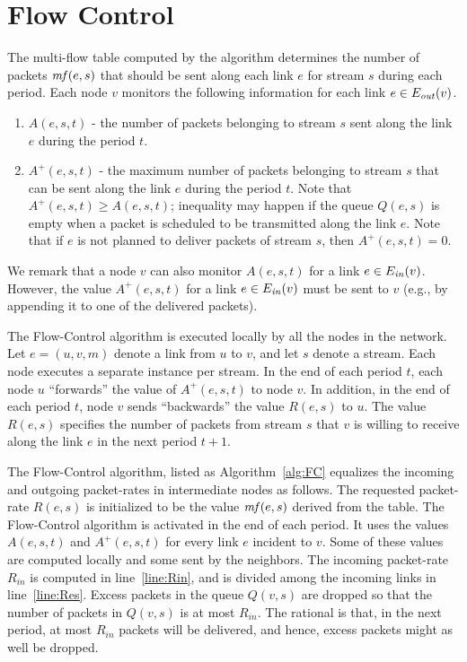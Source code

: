 \documentclass[12pt]{article}
\newenvironment{proof sketch}[1]{\noindent {\emph{Proof sketch of #1:}}}{\hfill \qed}
\newcommand{\mf}{\text{\emph{mf}}}
\newcommand{\Ein}{E_{\text{\emph{in}}}}
\newcommand{\Eout}{E_{\text{\emph{out}}}}
\begin{document}
\section{Flow Control}\label{sec:flow control}
The multi-flow table computed by the algorithm determines the number of packets $\mf(e,s)$
that should be sent along each link $e$ for stream $s$ during each period.
Each node $v$ monitors the following information for each link $e \in \Eout (v)$.
\begin{enumerate}
\item $A(e,s,t)$ - the number of packets belonging to stream $s$ sent
  along the link $e$ during the period $t$.
\item $A^+(e,s,t)$ - the maximum number of packets belonging to stream
  $s$ that can be sent along the link $e$ during the period $t$. Note
  that $A^+(e,s,t)\geq A(e,s,t)$; inequality may happen if the queue
  $Q(e,s)$ is empty when a packet is scheduled to be transmitted along
  the link $e$. Note that if $e$ is not planned to deliver packets of
  stream $s$, then $A^+(e,s,t)=0$.
\end{enumerate}
We remark that a node $v$ can also monitor $A(e,s,t)$ for a link $e\in
\Ein(v)$.  However, the value $A^+(e,s,t)$ for a link $e\in \Ein(v)$
must be sent to $v$ (e.g., by appending it to one of the delivered
packets).

The Flow-Control algorithm is executed locally by all the nodes in the
network. Let $e=(u,v,m)$ denote a link from $u$ to $v$, and let $s$
denote a stream. Each node executes a separate instance per stream.
In the end of each period $t$, each node $u$ ``forwards'' the value of
$A^+(e,s,t)$ to node $v$.  In addition, in the end of each period $t$,
node $v$ sends ``backwards'' the value $R(e,s)$ to $u$. The value
$R(e,s)$ specifies the number of packets from stream $s$ that $v$ is
willing to receive along the link $e$ in the next period
$t+1$.

The Flow-Control algorithm, listed as Algorithm~\ref{alg:FC} equalizes
the incoming and outgoing packet-rates in intermediate nodes as
follows.  The requested packet-rate $R(e,s)$ is initialized to be the
value $\mf(e,s)$ derived from the table.  The Flow-Control algorithm is
activated in the end of each period.  It uses the values $A(e,s,t)$
and $A^+(e,s,t)$ for every link $e$ incident to $v$.  Some of these
values are computed locally and some sent by the neighbors. The
incoming packet-rate $R_{in}$ is computed in line~\ref{line:Rin}, and
is divided among the incoming links in line~\ref{line:Res}. Excess
packets in the queue $Q(v,s)$ are dropped
so that the number of packets in $Q(v,s)$ is at most $R_{in}$. The
rational is that, in the next period, at most $R_{in}$ packets will be
delivered, and hence, excess packets might as well be dropped.
\end{document}
